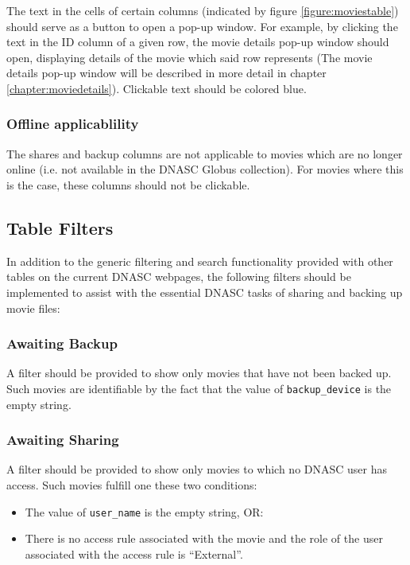 The text in the cells of certain columns (indicated by figure \ref{figure:moviestable}) should
serve as a button to open a pop-up window. For example, by clicking the text in the ID column 
of a given row, the movie details pop-up window should open, displaying details of the movie 
which said row represents (The movie details pop-up window will be described in more detail 
in chapter \ref{chapter:moviedetails}). Clickable text should be colored blue.

\subsubsection{Offline applicablility}

The shares and backup columns are not applicable to movies which are no longer online (i.e. not
available in the DNASC Globus collection). For movies where this is the case, these columns should
not be clickable.

\subsection{Table Filters}

In addition to the generic filtering and search functionality provided with other tables on the
current DNASC webpages, the following filters should be implemented to assist with the essential 
DNASC tasks of sharing and backing up movie files:

\subsubsection{Awaiting Backup}

A filter should be provided to show only movies that have not been backed up.
Such movies are identifiable by the fact that the value of \texttt{backup\_device} is the empty string. 

\subsubsection{Awaiting Sharing}

A filter should be provided to show only movies to which no DNASC user has access. Such movies 
fulfill one these two conditions:
\begin{itemize}\itemsep1pt
    \item The value of \texttt{user\_name} is the empty string, OR:
    \item There is no access rule associated with the movie and the role of the user associated 
    with the access rule is ``External''.
\end{itemize}

